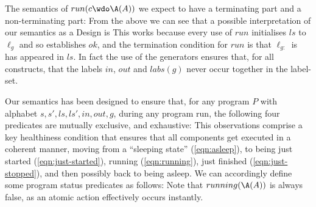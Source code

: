 The semantics of $run(c \wdo \A(A))$ we expect to have a terminating part
and a non-terminating part:
From the above we can see that a possible interpretation of our semantics as a
Design is
This works because every use of $run$ initialises $ls$ to $\ell_g$
and so establishes $ok$,
and the termination condition for $run$ is that $\ell_{g:}$
is has appeared in $ls$.
In fact the use of the generators ensures that, for all constructs,
that the labels $in$, $out$ and $labs(g)$ never occur together
in the label-set.


Our semantics has been designed
to ensure that,
for any program $P$ with alphabet $s,s',ls,ls',in,out,g$,
during any program run,
the following four predicates
are mutually exclusive, and exhaustive:
This observations comprise a key healthiness condition
that ensures that all  components get executed
in a coherent manner, moving from a ``sleeping state'' (\ref{eqn:asleep}),
to being just started (\ref{eqn:just-started}),
running (\ref{eqn:running}),
just finished (\ref{eqn:just-stopped}),
and then possibly back to being asleep.
We can accordingly define some program status predicates as follows:
Note that $running(\A(A))$ is always false,
as an atomic action effectively occurs instantly.
